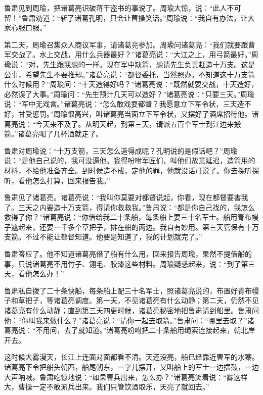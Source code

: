\documentclass[12pt,UTF-8,openany]{ctexbook}
\begin{document}
\begin{Large}
    
    鲁肃见到周瑜，把诸葛亮识破蒋干盗书的事说了。周瑜大惊，说：“此人不可留！”鲁肃劝道：“斩了诸葛孔明，只会让曹操笑话。”周瑜说：“我自有办法，让大家心服口服。”
    
    第二天，周瑜召集众人商议军事，请诸葛亮参加。周瑜问诸葛亮：“我们就要跟曹军交战了。水上交战，用什么兵器最好？”诸葛亮说：“大江之上，用弓箭最好。”周瑜说：“对，先生跟我想的一样。现在军中缺箭，想请先生负责赶造十万支。这是公事，希望先生不要推却。”诸葛亮说：“都督委托，当然照办。不知道这十万支箭什么时候用？”周瑜问：“十天造得好吗？”诸葛亮说：“既然就要交战，十天造好，必然误了大事。”周瑜问：“先生预计几天可以造好？”诸葛亮说：“只要三天。”周瑜说：“军中无戏言。”诸葛亮说：“怎么敢戏耍都督？我愿意立下军令状，三天造不好，甘受惩罚。”周瑜很高兴，叫诸葛亮当面立下军令状，又摆好了酒席招待他。诸葛亮说：“今天来不及了。从明天起，到第三天，请派五百个军士到江边来搬箭。”诸葛亮喝了几杯酒就走了。
    
    鲁肃对周瑜说：“十万支箭，三天怎么造得成呢？孔明说的是假话吧？”周瑜说：“是他自己说的，我可没逼他。我得吩咐军匠们，叫他们故意延迟，造箭用的材料，不给他准备齐全。到时候造不成，定他的罪，他就没话可说了。你去探听探听，看他怎么打算，回来报告我。”
    
    鲁肃见了诸葛亮。诸葛亮说：“我叫你莫要对都督说起，你看，现在都督要害我了。三天之内要造十万支箭，得请你救救我。”鲁肃说：“都是你自己找的，我怎么救得了你？”诸葛亮说：“你借给我二十条船，每条船上要三十名军士。船用青布幔子遮起来，还要一千多个草把子，排在船的两边。我自有妙用。第三天管保有十万支箭。不过不能让都督知道。他要是知道了，我的计划就完了。”
    
    鲁肃答应了。他不知道诸葛亮借了船有什么用，回来报告周瑜，果然不提借船的事，只说诸葛亮不用竹子、翎毛、胶漆这些材料。周瑜疑惑起来，说：“到了第三天，看他怎么办！”
    
    鲁肃私自拨了二十条快船，每条船上配三十名军士，照诸葛亮说的，布置好青布幔子和草把子，等诸葛亮调度。第一天，不见诸葛亮有什么动静；第二天，仍然不见诸葛亮有什么动静；直到第三天四更时候，诸葛亮秘密地把鲁肃请到船里。鲁肃问他：“你叫我来做什么？”诸葛亮说：“请你一起去取箭。”鲁肃问：“哪里去取？”诸葛亮说：“不用问，去了就知道。”诸葛亮吩咐把二十条船用绳索连接起来，朝北岸开去。
    
    这时候大雾漫天，长江上连面对面都看不清。天还没亮，船已经靠近曹军的水寨。诸葛亮下令把船头朝西，船尾朝东，一字儿摆开，又叫船上的军士一边擂鼓，一边大声呐喊。鲁肃吃惊地说：“如果曹兵出来，怎么办？”诸葛亮笑着说：“雾这样大，曹操一定不敢派兵出来。我们只管饮酒取乐，天亮了就回去。”
    

\end{Large}
\end{document}
